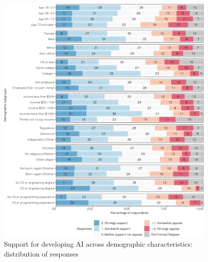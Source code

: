 \documentclass{article}
\begin{document}
\begin{figure}[hbtp]
\centering
\includegraphics[width=0.95\textwidth]{images/demographicsupportstackbar-1.pdf}
\caption{Support for developing AI across demographic characteristics: distribution of responses}
\label{fig:supportdemo}
\end{figure}


\FloatBarrier
\end{document}
